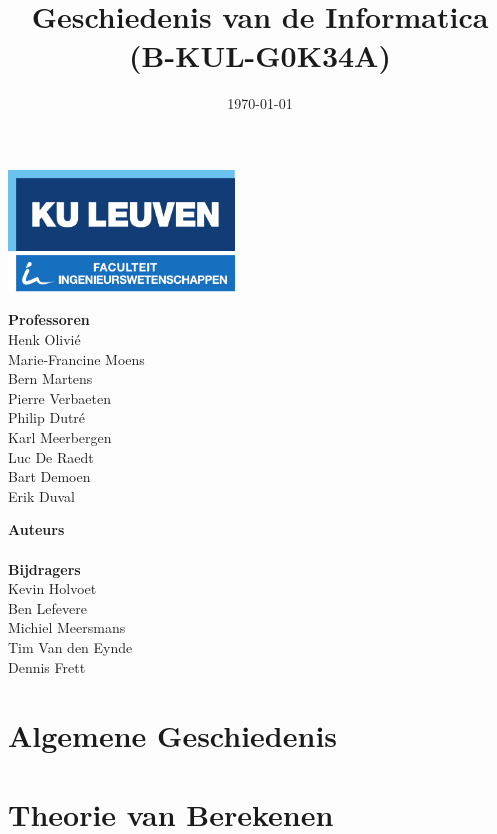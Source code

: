 \documentclass[11pt]{article}
\title{Geschiedenis van de Informatica \\ (B-KUL-G0K34A)}
\date{\today}
\author{\theauthors}
\newcommand{\thecontributors}{Kevin Holvoet \\ Ben Lefevere \\ Michiel Meersmans \\ Tim Van den Eynde \\ Dennis Frett}
\newcommand{\theprofs}{Henk Olivi\'e \\ Marie-Francine Moens \\ Bern Martens \\ Pierre Verbaeten \\ Philip Dutr\'e \\ Karl Meerbergen \\ Luc De Raedt \\ Bart Demoen \\ Erik Duval}
\theoremstyle{definition}
\begin{document}

\begin{titlepage}

\thispagestyle{empty}

\begin{minipage}{\textwidth}
	\includegraphics[width=60mm]{logokuleng.pdf}
\end{minipage}

\vspace{40mm}

\begin{minipage}{\textwidth}
	\Huge
	\sffamily
	\thetitle
\end{minipage}

\vspace{50mm}

\hfill
\begin{minipage}[t]{0.5\textwidth}
	\Large
	\sffamily
	\textbf{Professoren} \\
	\theprofs
\end{minipage}%
\begin{minipage}[t]{0.5\textwidth}
\begin{flushright}
	\Large
	\sffamily
	\textbf{Auteurs} \\
	\theauthor
	\vspace{10mm} \\
	\textbf{Bijdragers} \\
	\thecontributors
\end{flushright}
\end{minipage}
\vfill
\end{titlepage}

\newpage

\tableofcontents

\newpage

\section{Algemene Geschiedenis}



\newpage

\section{Theorie van Berekenen}

\newpage
\end{document}
